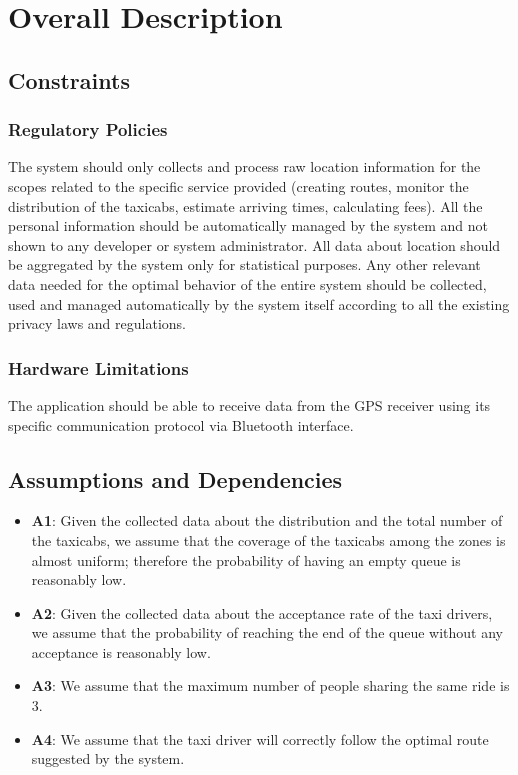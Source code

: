 \chapter{Overall Description} \label{chap2}

\section{Constraints}
\subsection{Regulatory Policies}
The system should only collects and process raw location information for the scopes related to the specific service provided (creating routes, monitor the distribution of the taxicabs, estimate arriving times, calculating fees). All the personal information should be automatically managed by the system and not shown to any developer or system administrator. All data about location should be aggregated by the system only for statistical purposes. 
Any other relevant data needed for the optimal behavior of the entire system should be collected, used and managed automatically by the system itself according to all the existing privacy laws and regulations.  

\subsection{Hardware Limitations}
The application should be able to receive data from the GPS receiver using its specific communication protocol via Bluetooth interface. 

\section{Assumptions and Dependencies} \label{assump}
\begin{itemize}
	\item \textbf{A1}: Given the collected data about the distribution and the total number of the taxicabs, we assume that the coverage of the taxicabs among the zones is almost uniform; therefore the probability of having an empty queue is reasonably low.
	\item \textbf{A2}: Given the collected data about the acceptance rate of the taxi drivers, we assume that the probability of reaching the end of the queue without any acceptance is reasonably low.
	\item \textbf{A3}: We assume that the maximum number of people sharing the same ride is 3.
	\item \textbf{A4}: We assume that the taxi driver will correctly follow the optimal route suggested by the system.
\end{itemize}

